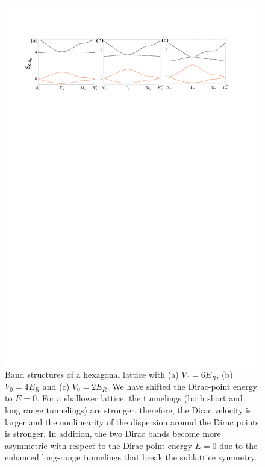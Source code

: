 \documentclass[twocolumn,english,prl,floatfix,citeautoscript,nofootinbib]{revtex4}
\begin{document}
\begin{widetext}
\begin{figure}[b]
\includegraphics[width=0.85\linewidth]{FigS1.pdf}
\caption{Band structures of a hexagonal lattice with (a) $V_{0}=6E_{R}$, (b)
$V_{0}=4E_{R}$ and (c) $V_{0}=2E_{R}$. We have shifted the Dirac-point
energy to $E=0$. For a shallower lattice, the tunnelings (both short and
long range tunnelings) are stronger, therefore, the Dirac velocity is larger
and the nonlinearity of the dispersion around the Dirac points is stronger.
In addition, the two Dirac bands become more asymmetric with respect to the
Dirac-point energy $E=0$ due to the enhanced long-range tunnelings that
break the sublattice symmetry.}
\label{fig:S1}
\end{figure}


\end{widetext}
\end{document}
